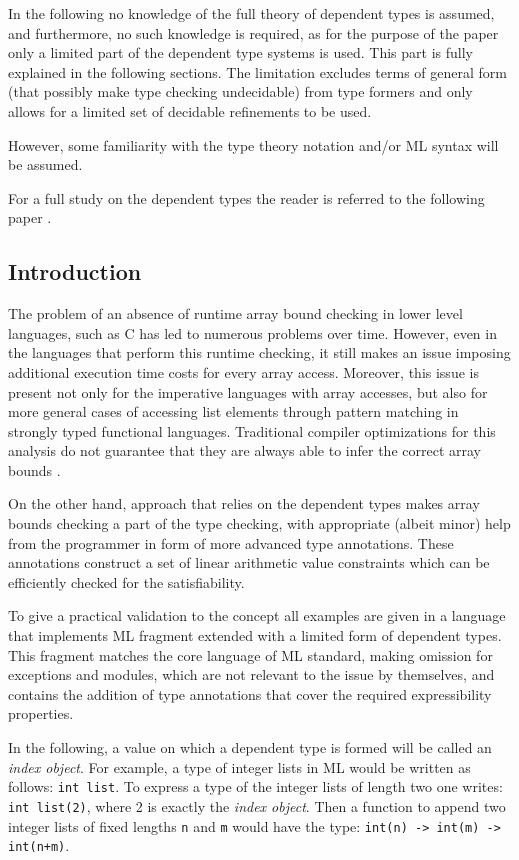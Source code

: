 \documentclass[a4paper,UKenglish]{lipics-v2016}
\begin{document}
In the following no knowledge of the full theory of dependent types is assumed,
and furthermore, no such knowledge is required, as for the purpose of the paper
only a limited part of the dependent type systems is used. This part is fully
explained in the following sections. The limitation excludes terms of general
form (that possibly make type checking undecidable) from type formers and only
allows for a limited set of decidable refinements to be used.

However, some familiarity with the type theory notation and/or ML syntax
will be assumed.

For a full study on the dependent types the reader is referred to the following
paper \cite{Hofmann97syntaxand}.

\subsection{Introduction}
The problem of an absence of runtime array bound checking in lower level
languages, such as C has led to numerous problems over time. However, even in
the languages that perform this runtime checking, it still makes an issue
imposing additional execution time costs for every array access.  Moreover,
this issue is present not only for the imperative languages with array
accesses, but also for more general cases of accessing list elements through
pattern matching in strongly typed functional languages. Traditional compiler
optimizations for this analysis do not guarantee that they are always able to
infer the correct array bounds \cite{Gupta:1993}\cite{Suzuki:1977}.

On the other hand, approach that relies on the dependent types makes array
bounds checking a part of the type checking, with appropriate (albeit minor)
help from the programmer in form of more advanced type annotations. These
annotations construct a set of linear arithmetic value constraints which can be
efficiently checked for the satisfiability.

To give a practical validation to the  concept all examples are given in a
language that implements ML fragment extended with a limited form of dependent
types. This fragment matches the core language of ML standard, making omission
for exceptions and modules, which are not relevant to the issue by themselves,
and contains the addition of type annotations that cover the required
expressibility properties.

In the following, a value on which a dependent type is formed will be called an
\emph{index object}. For example, a type of integer lists in ML would be
written as follows: \texttt{int list}. To express a type of the integer lists
of length two one writes: \texttt{int list(2)}, where 2 is exactly the
\emph{index object}.  Then a function to append two integer lists of fixed
lengths \texttt{n} and \texttt{m} would have the type: \texttt{int(n) -> int(m)
-> int(n+m)}.
\end{document}
